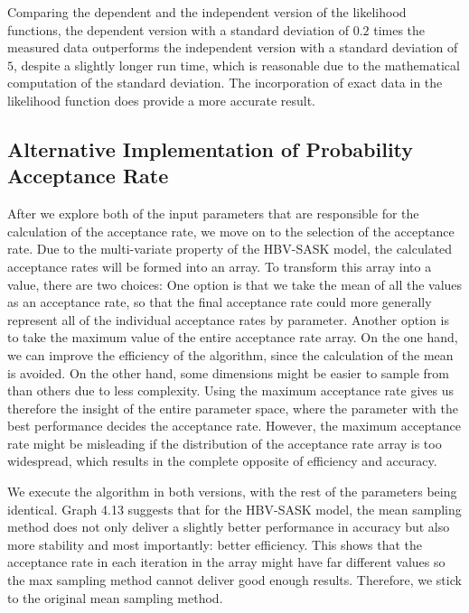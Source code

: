Comparing the dependent and the independent version of the likelihood functions, the dependent version with a standard deviation of $0.2$ times the measured data outperforms the independent version with a standard deviation of $5$, despite a slightly longer run time, which is reasonable due to the mathematical computation of the standard deviation. The incorporation of exact data in the likelihood function does provide a more accurate result.

\subsection{Alternative Implementation of Probability Acceptance Rate}
After we explore both of the input parameters that are responsible for the calculation of the acceptance rate, we move on to the selection of the acceptance rate. Due to the multi-variate property of the HBV-SASK model, the calculated acceptance rates will be formed into an array. To transform this array into a value, there are two choices: One option is that we take the mean of all the values as an acceptance rate, so that the final acceptance rate could more generally represent all of the individual acceptance rates by parameter. Another option is to take the maximum value of the entire acceptance rate array. On the one hand, we can improve the efficiency of the algorithm, since the calculation of the mean is avoided. On the other hand, some dimensions might be easier to sample from than others due to less complexity. Using the maximum acceptance rate gives us therefore the insight of the entire parameter space, where the parameter with the best performance decides the acceptance rate. However, the maximum acceptance rate might be misleading if the distribution of the acceptance rate array is too widespread, which results in the complete opposite of efficiency and accuracy.

We execute the algorithm in both versions, with the rest of the parameters being identical. Graph 4.13 suggests that for the HBV-SASK model, the mean sampling method does not only deliver a slightly better performance in accuracy but also more stability and most importantly: better efficiency. This shows that the acceptance rate in each iteration in the array might have far different values so the max sampling method cannot deliver good enough results. Therefore, we stick to the original mean sampling method.


